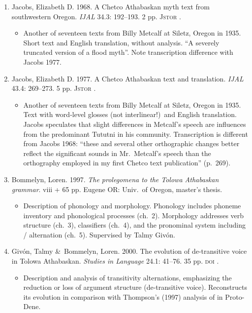 \documentclass[12pt,letterpaper,oneside,article]{memoir}
\begin{document}
\begin{enumerate}
\item	Jacobs, Elizabeth D.
	1968.
	A Chetco Athabaskan myth text from southwestern Oregon.
	\textit{IJAL} 34.3: 192–193.
	2 pp.
	\textsc{Jstor} .
	\begin{itemize}
	\item	Another of seventeen texts from Billy Metcalf at Siletz, Oregon in 1935.
		Short text and English translation, without analysis.
		“A severely truncated version of a flood myth”.
		Note transcription difference with Jacobs 1977.
	\end{itemize}
\item	Jacobs, Elizabeth D.
	1977.
	A Chetco Athabaskan text and translation.
	\textit{IJAL} 43.4: 269–273.
	5 pp.
	\textsc{Jstor} .
	\begin{itemize}
	\item	Another of seventeen texts from Billy Metcalf at Siletz, Oregon in 1935.
		Text with word-level glosses (not interlinear!)\ and English translation.
		Jacobs speculates that slight differences in Metcalf’s speech are
		influences from the predominant Tututni in his community.
		Transcription is different from Jacobs 1968: “these and several other
		orthographic changes better reflect the significant sounds in Mr.\ Metcalf’s
		speech than the orthography employed in my first Chetco text publication”
		(p.\ 269).
	\end{itemize}
\item	Bommelyn, Loren.
	1997.
	\textit{The prolegomena to the Tolowa Athabaskan grammar}.
	viii + 65 pp.
	Eugene OR: Univ.\ of Oregon, master’s thesis.
	\begin{itemize}
	\item	Description of phonology and morphology.
		Phonology includes phoneme inventory and phonological processes (ch.\ 2).
		Morphology addresses verb structure (ch.\ 3), classifiers (ch.\ 4), and
		the pronominal system including / alternation (ch.\ 5).
		Supervised by Talmy Givón.
	\end{itemize}
\item	Givón, Talmy \&\ Bommelyn, Loren.
	2000.
	The evolution of de-transitive voice in Tolowa Athabaskan.
	\textit{Studies in Language} 24.1: 41–76.
	35 pp.
	\textsc{doi} .
	\begin{itemize}
	\item	Description and analysis of transitivity alternations, emphasizing the
		reduction or loss of argument structure (de-transitive voice).
		Reconstructs its evolution in comparison with Thompson’s (1997)
		analysis of  in Proto-Dene.
	\end{itemize}
\end{enumerate}
\end{document}
